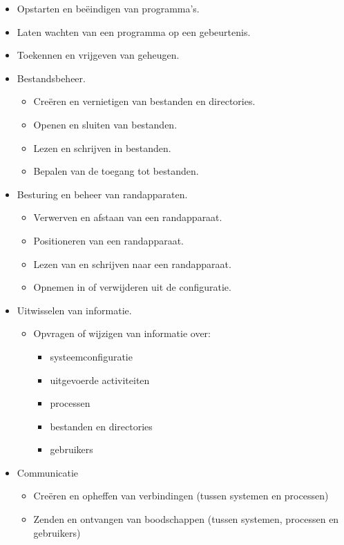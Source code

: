 \begin{itemize}
\item Opstarten en be\"eindigen van programma's.
\item Laten wachten van een programma op een gebeurtenis.
\item Toekennen en vrijgeven van geheugen.
\item Bestandsbeheer.
  \begin{itemize}
  \item Cre\"eren en vernietigen van bestanden en directories.
  \item Openen en sluiten van bestanden.
  \item Lezen en schrijven in bestanden.
  \item Bepalen van de toegang tot bestanden.
  \end{itemize}
\item Besturing en beheer van randapparaten.
  \begin{itemize}
  \item Verwerven en afstaan van een randapparaat.
  \item Positioneren van een randapparaat.
  \item Lezen van en schrijven naar een randapparaat.
  \item Opnemen in of verwijderen uit de configuratie.
  \end{itemize}
\item Uitwisselen van informatie.
  \begin{itemize}
  \item Opvragen of wijzigen van informatie over:
    \begin{itemize}
    \item systeemconfiguratie
    \item uitgevoerde activiteiten
    \item processen
    \item bestanden en directories
    \item gebruikers
    \end{itemize}
  \end{itemize}
\item Communicatie
  \begin{itemize}
  \item Cre\"eren en opheffen van verbindingen (tussen systemen en processen)
  \item Zenden en ontvangen van boodschappen (tussen systemen, processen en
gebruikers)
  \end{itemize}
\end{itemize}

